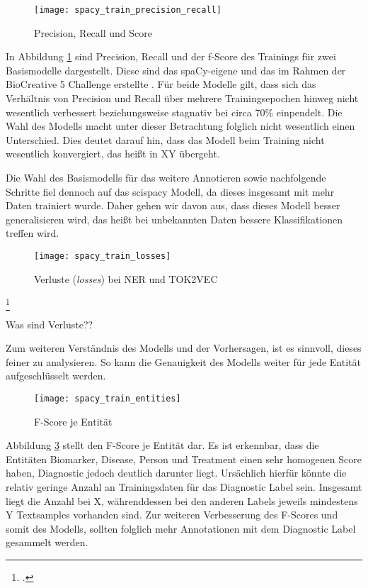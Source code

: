 \begin{figure}[H]
    \centering
    \caption[]{Precision, Recall und Score}
	\label{fig:TrainPrecisionRecall}
    \texttt{[image: spacy\_train\_precision\_recall]}
\end{figure}
In Abbildung \ref{fig:TrainPrecisionRecall} sind Precision, Recall und der f-Score des Trainings für zwei Basismodelle dargestellt. Diese sind das spaCy-eigene \grqq{} und das im Rahmen der BioCreative 5 Challenge erstellte \grqq. Für beide Modelle gilt, dass sich das Verhältnis von Precision und Recall über mehrere Trainingsepochen hinweg nicht wesentlich verbessert beziehungsweise stagnativ bei circa 70\% einpendelt. Die Wahl des Modells macht unter dieser Betrachtung folglich nicht wesentlich einen Unterschied. Dies deutet darauf hin, dass das Modell beim Training nicht wesentlich konvergiert, das heißt in XY übergeht.

Die Wahl des Basismodells für das weitere Annotieren sowie nachfolgende Schritte fiel dennoch auf das scispacy Modell, da dieses insgesamt mit mehr Daten trainiert wurde. Daher gehen wir davon aus, dass dieses Modell besser generalisieren wird, das heißt bei unbekannten Daten bessere Klassifikationen treffen wird.
\begin{figure}[H]
    \centering
    \caption[]{Verluste (\textit{losses}) bei \ac{NER} und TOK2VEC}
	\label{fig:TrainLosses}
    \texttt{[image: spacy\_train\_losses]}
\end{figure}
\footcite[]{tsai2006}

Was sind Verluste??

Zum weiteren Verständnis des Modells und der Vorhersagen, ist es sinnvoll, dieses feiner zu analysieren. So kann die Genauigkeit des Modells weiter für jede Entität aufgeschlüsselt werden.

\begin{figure}[H]
    \centering
    \caption[]{F-Score je Entität}
	\label{fig:TrainEntities}
    \texttt{[image: spacy\_train\_entities]}
\end{figure}
Abbildung \ref{fig:TrainEntities} stellt den F-Score je Entität dar. Es ist erkennbar, dass die Entitäten Biomarker, Disease, Person und Treatment einen sehr homogenen Score haben, Diagnostic jedoch deutlich darunter liegt. Ursächlich hierfür könnte die relativ geringe Anzahl an Trainingsdaten für das Diagnostic Label sein. Insgesamt liegt die Anzahl bei X, währenddessen bei den anderen Labels jeweils mindestens Y Textsamples vorhanden sind. Zur weiteren Verbesserung des F-Scores und somit des Modells, sollten folglich mehr Annotationen mit dem Diagnostic Label gesammelt werden.

